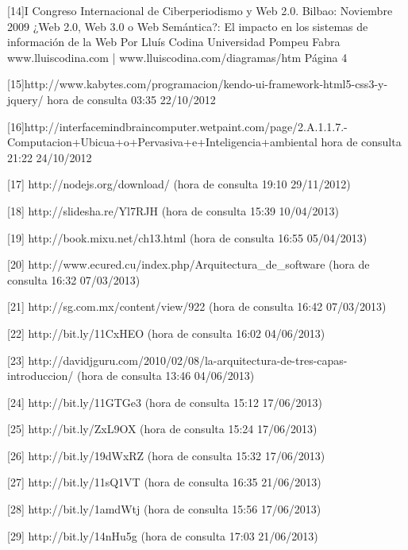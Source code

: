 [14]I Congreso Internacional de Ciberperiodismo y Web 2.0. Bilbao: Noviembre 2009
    ¿Web 2.0, Web 3.0 o Web Semántica?: El impacto en los sistemas de
    información de la Web
    Por Lluís Codina
    Universidad Pompeu Fabra
    www.lluiscodina.com | www.lluiscodina.com/diagramas/htm
    Página 4
    
[15]http://www.kabytes.com/programacion/kendo-ui-framework-html5-css3-y-jquery/ hora de consulta 03:35 22/10/2012

[16]http://interfacemindbraincomputer.wetpaint.com/page/2.A.1.1.7.-Computacion+Ubicua+o+Pervasiva+e+Inteligencia+ambiental hora de consulta 
21:22 24/10/2012

[17] http://nodejs.org/download/ (hora de consulta 19:10 29/11/2012) 

[18] http://slidesha.re/Yl7RJH (hora de consulta 15:39 10/04/2013) 

[19] http://book.mixu.net/ch13.html (hora de consulta 16:55 05/04/2013)

[20] http://www.ecured.cu/index.php/Arquitectura\_de\_software (hora de consulta 16:32 07/03/2013)

[21] http://sg.com.mx/content/view/922 (hora de consulta 16:42 07/03/2013)

[22] http://bit.ly/11CxHEO (hora de consulta 16:02 04/06/2013)

[23] http://davidjguru.com/2010/02/08/la-arquitectura-de-tres-capas-introduccion/ (hora de consulta 13:46 04/06/2013)

[24] http://bit.ly/11GTGe3 (hora de consulta 15:12 17/06/2013)

[25] http://bit.ly/ZxL9OX (hora de consulta 15:24 17/06/2013)

[26] http://bit.ly/19dWxRZ (hora de consulta 15:32 17/06/2013)

[27] http://bit.ly/11sQ1VT (hora de consulta 16:35 21/06/2013)

[28] http://bit.ly/1amdWtj (hora de consulta 15:56 17/06/2013)

[29] http://bit.ly/14nHu5g (hora de consulta 17:03 21/06/2013)
